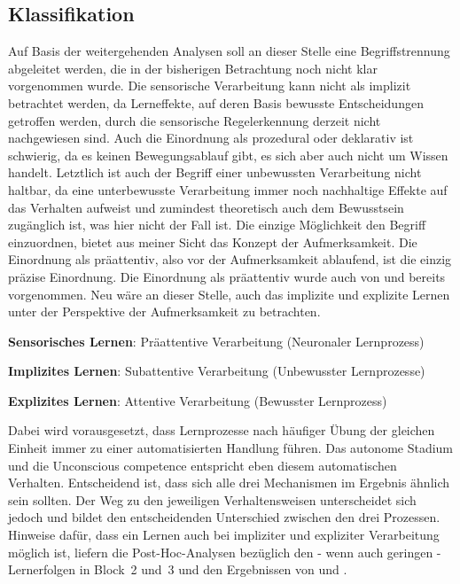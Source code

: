 \documentclass[doc,a4paper,12pt]{apa6}
\begin{document}
\subsection{Klassifikation}

Auf Basis der weitergehenden Analysen soll an dieser Stelle eine Begriffstrennung abgeleitet werden, die in der bisherigen Betrachtung noch nicht klar vorgenommen wurde. Die sensorische Verarbeitung kann nicht als implizit betrachtet werden, da Lerneffekte, auf deren Basis bewusste Entscheidungen getroffen werden, durch die sensorische Regelerkennung derzeit nicht nachgewiesen sind. Auch die Einordnung als prozedural oder deklarativ ist schwierig, da es keinen Bewegungsablauf gibt, es sich aber auch nicht um Wissen handelt. Letztlich ist auch der Begriff einer unbewussten Verarbeitung nicht haltbar, da eine unterbewusste Verarbeitung immer noch nachhaltige Effekte auf das Verhalten aufweist und zumindest theoretisch auch dem Bewusstsein zugänglich ist, was hier nicht der Fall ist. Die einzige Möglichkeit den Begriff einzuordnen, bietet aus meiner Sicht das Konzept der Aufmerksamkeit. Die Einordnung als präattentiv, also vor der Aufmerksamkeit ablaufend, ist die einzig präzise Einordnung. Die Einordnung als präattentiv wurde auch von \textcite{paavilainen2007preattentive} und \textcite{bendixen2008rapid} bereits vorgenommen. Neu wäre an dieser Stelle, auch das implizite und explizite Lernen unter der Perspektive der Aufmerksamkeit zu betrachten.

\begin{compactitem}
  \item \textbf{Sensorisches Lernen}: Präattentive Verarbeitung (Neuronaler Lernprozess)
  \item \textbf{Implizites Lernen}: Subattentive Verarbeitung (Unbewusster Lernprozesse)
  \item \textbf{Explizites Lernen}: Attentive Verarbeitung (Bewusster Lernprozess)
\end{compactitem}

Dabei wird vorausgesetzt, dass Lernprozesse nach häufiger Übung der gleichen Einheit immer zu einer automatisierten Handlung führen. Das autonome Stadium und die Unconscious competence entspricht eben diesem automatischen Verhalten. Entscheidend ist, dass sich alle drei Mechanismen im Ergebnis ähnlich sein sollten. Der Weg zu den jeweiligen Verhaltensweisen unterscheidet sich jedoch und bildet den entscheidenden Unterschied zwischen den drei Prozessen. Hinweise dafür, dass ein Lernen auch bei impliziter und expliziter Verarbeitung möglich ist, liefern die Post-Hoc-Analysen bezüglich den - wenn auch geringen - Lernerfolgen in Block~2 und~3 und den Ergebnissen von \textcite{paavilainen2007preattentive} und \textcite{bendixen2008rapid}.
\end{document}
